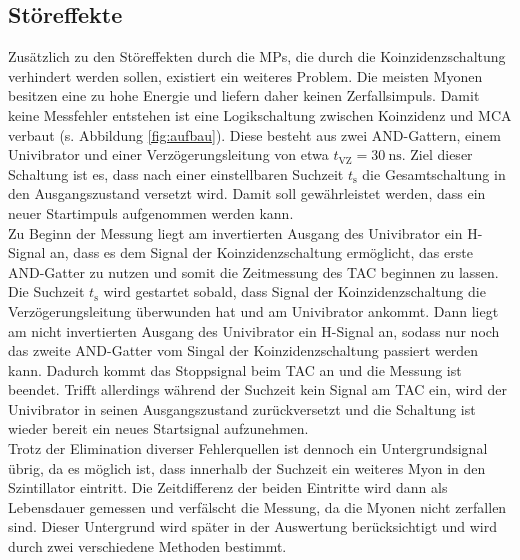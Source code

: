 \subsection{Störeffekte}
\label{sec:Störeffekte}
Zusätzlich zu den Störeffekten durch die MPs, die durch die Koinzidenzschaltung verhindert werden sollen, existiert ein weiteres Problem. Die meisten Myonen besitzen eine zu hohe Energie
und liefern daher keinen Zerfallsimpuls. Damit keine Messfehler entstehen ist eine Logikschaltung zwischen Koinzidenz und MCA verbaut (s. Abbildung \ref{fig:aufbau}). Diese besteht aus zwei
AND-Gattern, einem Univibrator und einer Verzögerungsleitung von etwa $t_\mathrm{VZ}=\SI{30}{\nano\second}$. Ziel dieser Schaltung ist es, dass nach einer einstellbaren Suchzeit $t_\mathrm{s}$ die Gesamtschaltung in den Ausgangszustand versetzt wird. Damit soll gewährleistet werden, dass ein neuer Startimpuls aufgenommen werden kann. \\
Zu Beginn der Messung liegt am invertierten Ausgang des Univibrator ein H-Signal an, dass es dem Signal der Koinzidenzschaltung ermöglicht, das erste AND-Gatter zu nutzen und somit die Zeitmessung
des TAC beginnen zu lassen. Die Suchzeit $t_\mathrm{s}$ wird gestartet sobald, dass Signal der Koinzidenzschaltung die Verzögerungsleitung überwunden hat und am Univibrator ankommt. Dann liegt
am nicht invertierten Ausgang des Univibrator ein H-Signal an, sodass nur noch das zweite AND-Gatter vom Singal der Koinzidenzschaltung passiert werden kann. Dadurch kommt das Stoppsignal beim TAC
an und die Messung ist beendet. Trifft allerdings während der Suchzeit kein Signal am TAC ein, wird der Univibrator in seinen Ausgangszustand zurückversetzt und die Schaltung ist wieder bereit ein
neues Startsignal aufzunehmen. \\
Trotz der Elimination diverser Fehlerquellen ist dennoch ein Untergrundsignal übrig, da es möglich ist, dass innerhalb der Suchzeit ein weiteres Myon in den Szintillator eintritt.
Die Zeitdifferenz der beiden Eintritte wird dann als Lebensdauer gemessen und verfälscht die Messung, da die Myonen nicht zerfallen sind. Dieser Untergrund wird später in der Auswertung
berücksichtigt und wird durch zwei verschiedene Methoden bestimmt.
